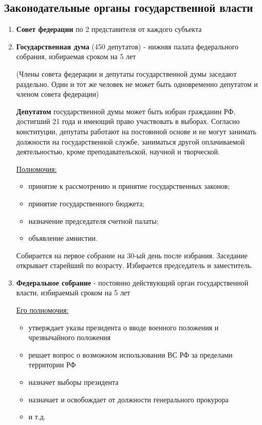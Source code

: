 \documentclass[a5paper,10pt]{article}
\begin{document}
		\subsection{Законодательные органы государственной власти}
			\begin{enumerate}
				\item \textbf{Совет федерации} по 2 представителя от каждого субъекта
				
				\item \textbf{Государственная дума} (450 депутатов) - нижняя палата федерального собрания, избираемая сроком на 5 лет \par
					(Члены совета федерации и депутаты государственной думы заседают раздельно. Один и тот же человек не может быть одновременно депутатом и членом совета федерации) \par
					\textbf{Депутатом} государственной думы может быть избран гражданин РФ, достигший 21 года и имеющий право участвовать в выборах.
					Согласно конституции, депутаты работают на постоянной основе и не могут занимать должности на государственной службе, заниматься другой оплачиваемой деятельностью, кроме преподавательской, научной и творческой. \par
					\underline{Полномочия:}
					\begin{itemize}
						\item принятие к рассмотрению и принятие государственных законов;
						\item принятие государственного бюджета;
						\item назначение председателя счетной палаты;
						\item объявление амнистии.
					\end{itemize}
					Собирается на первое собрание на 30-ый день после избрания. Заседание открывает старейший по возрасту. Избирается председатель и заместитель.

				\item \textbf{Федеральное собрание} - постоянно действующий орган государственной власти, избираемый сроком на 5 лет \par
					\underline{Его полномочия:}
					\begin{itemize}
						\item утверждает указы президента о вводе военного положения и чрезвычайного положения
						\item решает вопрос о возможном использовании ВС РФ за пределами территории РФ
						\item назначет выборы президента
						\item назначает и освобождает от должности генерального прокурора
						\item и т.д.
					\end{itemize}
			\end{enumerate}
\end{document}
